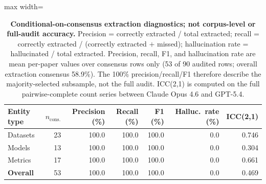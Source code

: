 \begin{table}[H]
\centering
\caption{\textbf{Conditional-on-consensus extraction diagnostics; not corpus-level or full-audit accuracy.} Precision = correctly extracted / total extracted; recall = correctly extracted / (correctly extracted $+$ missed); hallucination rate = hallucinated / total extracted. Precision, recall, F1, and hallucination rate are mean per-paper values over consensus rows only (53 of 90 audited rows; overall extraction consensus 58.9\%). The 100\% precision/recall/F1 therefore describe the majority-selected subsample, not the full audit. ICC(2,1) is computed on the full pairwise-complete count series between Claude Opus 4.6 and GPT-5.4.}
\label{tab:annotation_extraction}
\begin{adjustbox}{max width=\textwidth}
\begin{tabular}{l r rrrr r}
\toprule
Entity type & $n_{\mathrm{cons.}}$ & Precision (\%) & Recall (\%) & F1 (\%) & Halluc.\ rate (\%) & ICC(2,1) \\
\midrule
Datasets & 23 & 100.0 & 100.0 & 100.0 & 0.0 & 0.746 \\
Models & 13 & 100.0 & 100.0 & 100.0 & 0.0 & 0.304 \\
Metrics & 17 & 100.0 & 100.0 & 100.0 & 0.0 & 0.661 \\
\textbf{Overall} & 53 & 100.0 & 100.0 & 100.0 & 0.0 & 0.469 \\
\bottomrule
\end{tabular}
\end{adjustbox}
\end{table}
